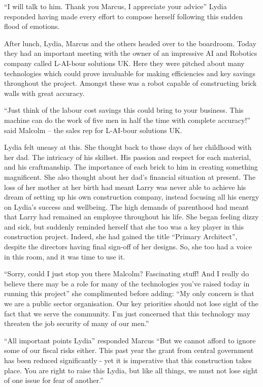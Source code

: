 “I will talk to him. Thank you Marcus, I appreciate your advice” Lydia
responded having made every effort to compose herself following this
sudden flood of emotions.

After lunch, Lydia, Marcus and the others headed over to the
boardroom. Today they had an important meeting with the owner of an
impressive AI and Robotics company called L-AI-bour solutions UK. Here
they were pitched about many technologies which could prove invaluable
for making efficiencies and key savings throughout the project.
Amongst these was a robot capable of constructing brick walls with
great accuracy.

“Just think of the labour cost savings this could bring to your
business. This machine can do the work of five men in half the time
with complete accuracy!” said Malcolm – the sales rep for L-AI-bour
solutions UK.

Lydia felt uneasy at this. She thought back to those days of her
childhood with her dad. The intricacy of his skillset. His passion and
respect for each material, and his craftmanship. The importance of
each brick to him in creating something magnificent. She also thought
about her dad's financial situation at present. The loss of her mother
at her birth had meant Larry was never able to achieve his dream of
setting up his own construction company, instead focusing all his
energy on Lydia’s success and wellbeing. The high demands of
parenthood had meant that Larry had remained an employee throughout
his life. She began feeling dizzy and sick, but suddenly reminded
herself that she too was a key player in this construction
project. Indeed, she had gained the title “Primary Architect”, despite
the directors having final sign-off of her designs. So, she too had a
voice in this room, and it was time to use it.

“Sorry, could I just stop you there Malcolm? Fascinating stuff! And I
really do believe there may be a role for many of the technologies
you've raised today in running this project” she complimented before
adding: “My only concern is that we are a public sector
organisation. Our key priorities should not lose sight of the fact
that we serve the community. I'm just concerned that this technology
may threaten the job security of many of our men.”

“All important points Lydia” responded Marcus “But we cannot afford to
ignore some of our fiscal risks either.  This past year the grant from
central government has been reduced significantly - yet it is
imperative that this construction takes place. You are right to raise
this Lydia, but like all things, we must not lose sight of one issue
for fear of another.”

